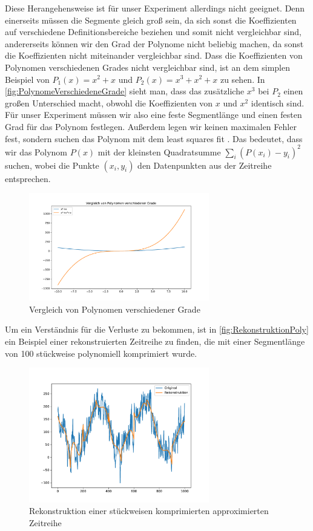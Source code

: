 Diese Herangehensweise ist für unser Experiment allerdings nicht geeignet. Denn einerseits müssen die Segmente gleich groß sein, da sich sonst die Koeffizienten auf verschiedene Definitionsbereiche beziehen und somit nicht vergleichbar sind, andererseits können wir den Grad der Polynome nicht beliebig machen, da sonst die Koeffizienten nicht miteinander vergleichbar sind. Dass die Koeffizienten von Polynomen verschiedenen Grades nicht vergleichbar sind, ist an dem simplen Beispiel von $P_1(x)=x^2+x$ und $P_2(x)=x^3+x^2+x$ zu sehen. In \autoref{fig:PolynomeVerschiedeneGrade} sieht man, dass das zusätzliche $x^3$ bei $P_2$ einen großen Unterschied macht, obwohl die Koeffizienten von $x$ und $x^2$ identisch sind. Für unser Experiment müssen wir also eine feste Segmentlänge und einen festen Grad für das Polynom festlegen. Außerdem legen wir keinen maximalen Fehler fest, sondern suchen das Polynom mit dem least squares fit \cite{leastSquares}. Das bedeutet, dass wir das Polynom $P(x)$ mit der kleinsten Quadratsumme $\sum_i (P(x_i)-y_i)^2$ suchen, wobei die Punkte $(x_i,y_i)$ den Datenpunkten aus der Zeitreihe entsprechen.
\begin{figure}[bth] 
  \centering
  \includegraphics[width=0.7\textwidth]{Graphics/ComparissonDifferentPolDegrees.pdf}
  \caption{Vergleich von Polynomen verschiedener Grade}
  \label{fig:PolynomeVerschiedeneGrade}
\end{figure}

Um ein Verständnis für die Verluste zu bekommen, ist in \autoref{fig:RekonstruktionPoly} ein Beispiel einer rekonstruierten Zeitreihe zu finden, die mit einer Segmentlänge von 100 stückweise polynomiell komprimiert wurde.
\begin{figure}[bth] 
  \centering
  \includegraphics[width=0.7\textwidth]{Graphics/RekonstruktionPoly.pdf}
  \caption{Rekonstruktion einer stückweisen komprimierten approximierten Zeitreihe}
  \label{fig:RekonstruktionPoly}
\end{figure}

